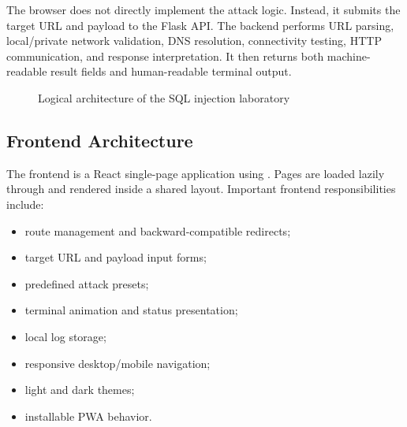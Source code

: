 \documentclass[12pt,a4paper]{article}
\newcommand{\code}[1]{\texttt{\detokenize{#1}}}
\begin{document}
The browser does not directly implement the attack logic. Instead, it submits the target URL and payload to the Flask API. The backend performs URL parsing, local/private network validation, DNS resolution, connectivity testing, HTTP communication, and response interpretation. It then returns both machine-readable result fields and human-readable terminal output.

\begin{figure}[H]
\centering
{}
\caption{Logical architecture of the SQL injection laboratory}
\label{fig:architecture}
\end{figure}

\subsection{Frontend Architecture}

The frontend is a React single-page application using \code{HashRouter}. Pages are loaded lazily through \code{React.lazy} and rendered inside a shared layout. Important frontend responsibilities include:

\begin{itemize}[leftmargin=1.4cm]
    \item route management and backward-compatible redirects;
    \item target URL and payload input forms;
    \item predefined attack presets;
    \item terminal animation and status presentation;
    \item local log storage;
    \item responsive desktop/mobile navigation;
    \item light and dark themes;
    \item installable PWA behavior.
\end{itemize}
\end{document}
